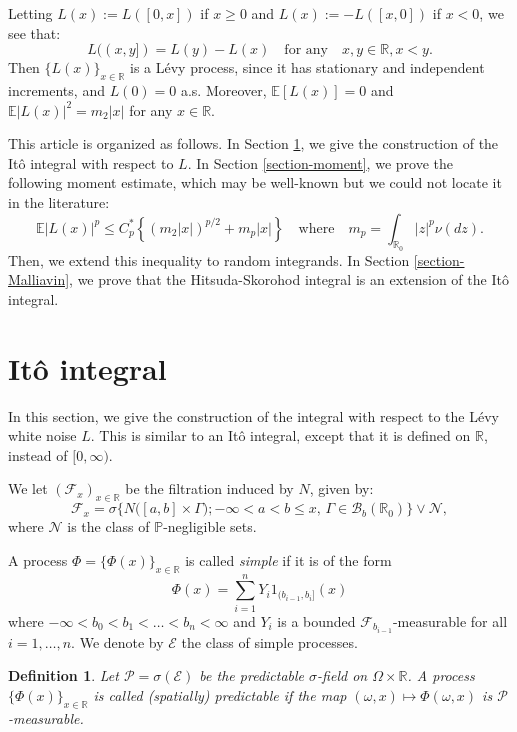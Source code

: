 \documentclass[12pt]{article}
\newtheorem{definition}[theorem]{Definition}
\def\cB{\mathcal{B}}
\def\cE{\mathcal{E}}
\def\cF{\mathcal{F}}
\def\cN{\mathcal{N}}
\def\cP{\mathcal{P}}
\def\bE{\mathbb{E}}
\def\bP{\mathbb{P}}
\def\bR{\mathbb{R}}
\def\s{\sigma}
\begin{document}
Letting $L(x):=L([0,x])$ if $x \geq 0$ and $L(x):=-L([x,0])$ if $x<0$, we see that:
\[
L((x,y])=L(y)-L(x) \quad \mbox{for any} \quad x,y \in \bR, x<y.
\] 
Then $\{L(x)\}_{x\in \bR}$ is a L\'evy process, since it has stationary and independent increments, and $L(0)=0$ a.s. Moreover, $\bE[L(x)]=0$ and $\bE|L(x)|^2=m_2 |x|$ for any $x \in \bR$.


\medskip

This article is organized as follows. In Section \ref{section-Ito}, we give the construction of the It\^o integral with respect to $L$. In Section \ref{section-moment}, we prove the following moment estimate, which may be well-known but we could not locate it in the literature:
\[
\bE|L(x)|^p \leq C_p^* \left\{(m_2|x|)^{p/2}+m_p|x| \right\} \quad 
\mbox{where} \quad
m_p=\int_{\bR_0}|z|^p\nu(dz).
\]
Then, we extend this inequality to random integrands. 
In Section \ref{section-Malliavin}, we prove that the Hitsuda-Skorohod integral is an extension of the It\^o integral.




\section{It\^o integral}
\label{section-Ito}

In this section, we give the construction of the integral with respect to the L\'evy white noise $L$. This is similar to an It\^o integral, except that it is defined on $\bR$, instead of $[0,\infty)$.

\medskip

We let $(\cF_x)_{x\in \bR}$ be the filtration induced by $N$, given by:
\[
\cF_x=\s\big\{ N\big([a,b] \times \Gamma\big); -\infty<a<b\leq x,  \, \Gamma \in \cB_b(\bR_0) \big\} \vee \cN,
\]
where $\cN$ is the class of $\bP$-negligible sets.

A process $\Phi=\{\Phi(x)\}_{x\in \bR}$ is called {\em simple} if it is of the form
\begin{equation}
\label{simple}
\Phi(x)=\sum_{i=1}^n Y_i 1_{(b_{i-1},b_i]}(x)
\end{equation}
where $-\infty<b_0<b_1<\ldots<b_n<\infty$ and $Y_i$ is a bounded $\cF_{b_{i-1}}$-measurable for all $i=1,\ldots,n$. 
We denote by $\cE$ the class of simple processes. 

\begin{definition}
\label{def-pred}
{\rm
Let $\cP=\s(\cE)$ be the predictable $\sigma$-field on $\Omega \times \bR$. A process $\{\Phi(x)\}_{x\in \bR}$ is called {\em (spatially) predictable} if the map $(\omega,x) \mapsto \Phi(\omega,x)$ is $\cP$-measurable.
}
\end{definition}
\end{document}
